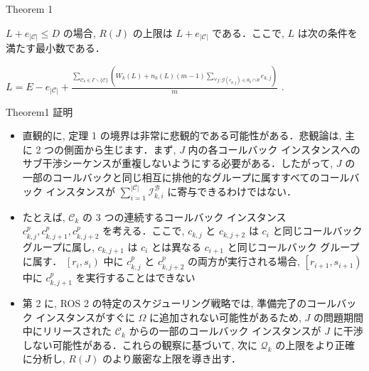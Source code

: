\begin{frame}{Theorem 1}
    \begin{theorem}[]
        $L+e_{|\mathcal{C}|} \leq D$ の場合, $R(J)$ の上限は $L+e_{|\mathcal{C}|}$ である．ここで, $L$ は次の条件を満たす最小数である．

        $L=E-e_{|\mathcal{C}|}+\frac{\sum_{\mathcal{C}_{k} \in \Gamma \backslash\{\mathcal{C}\}}\left(W_{k}(L)+n_{k}(L)(m-1) \sum_{\forall j: \mathcal{G}\left(c_{k, j}\right) \in \theta_{k} \cap \theta} e_{k, j}\right)}{m}$ .
    \end{theorem}
\end{frame}

\begin{frame}{Theorem1 証明}
    \todo{}
\end{frame}

\begin{frame}{}
    \begin{itemize}
        \item 直観的に, 定理 1 の境界は非常に悲観的である可能性がある．悲観論は, 主に 2 つの側面から生じます．まず, $J$ 内の各コールバック インスタンスへのサブ干渉シーケンスが重複しないようにする必要がある．したがって, $J$ の一部のコールバックと同じ相互に排他的なグループに属すすべてのコールバック インスタンスが $\sum_{i=1}^{|\mathcal{C}|} \mathcal{I}_{k, i}^{\mathcal{B}}$ に寄与できるわけではない．
    \end{itemize}
\end{frame}

\begin{frame}{}
    \begin{itemize}
        \item たとえば, $\mathcal{C}_{k}$ の 3 つの連続するコールバック インスタンス $c_{k, j}^{p}, c_{k, j+1}^{p}, c_{k, j+2}^{p}$ を考える．ここで, $c_{k, j}$ と $c_{k, j+2}$ は $c_{i}$ と同じコールバック グループに属し, $c_{k, j+1}$ は $c_{i}$ とは異なる $c_{i+1}$ と同じコールバック グループに属す． $\left[r_{i}, s_{i}\right)$ 中に $c_{k, j}^{p}$ と $c_{k, j+2}^{p}$ の両方が実行される場合, $\left[r_{i+1}, s_{i+1}\right)$ 中に $c_{k, j+1}^{p}$ を実行することはできない
    \end{itemize}
\end{frame}

\begin{frame}{}
    \begin{itemize}
        \item 第 2 に, ROS 2 の特定のスケジューリング戦略では, 準備完了のコールバック インスタンスがすぐに $\Omega$ に追加されない可能性があるため, $J$ の問題期間中にリリースされた $\mathcal{C}_{k}$ からの一部のコールバック インスタンスが $J$ に干渉しない可能性がある．これらの観察に基づいて, 次に $\mathcal{Q}_{k}$ の上限をより正確に分析し, $R(J)$ のより厳密な上限を導き出す．
    \end{itemize}
\end{frame}
